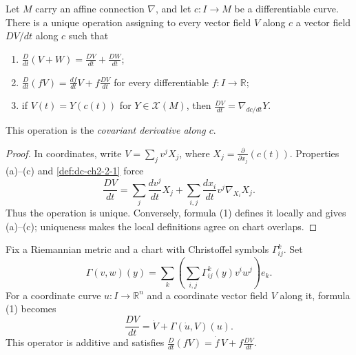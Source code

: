 \begin{proposition}
  \label{prop:dc-ch2-2-2}


  Let $M$ carry an affine connection $\nabla$, and let $c\colon I\to M$ be a
  differentiable curve. There is a unique operation assigning to every vector
  field $V$ along $c$ a vector field $DV/dt$ along $c$ such that
  \begin{enumerate}
    \item[(a)] $\frac{D}{dt}(V+W)=\frac{DV}{dt}+\frac{DW}{dt}$;
    \item[(b)] $\frac{D}{dt}(fV)=\frac{df}{dt}V+f\frac{DV}{dt}$ for every
      differentiable $f\colon I\to\mathbb{R}$;
    \item[(c)] if $V(t)=Y(c(t))$ for $Y\in\mathcal{X}(M)$, then
      $\frac{DV}{dt}=\nabla_{dc/dt}Y$.
  \end{enumerate}
  This operation is the \emph{covariant derivative along $c$}.
\end{proposition}
\begin{proof}

  \sketch
  In coordinates, write $V=\sum_jv^jX_j$, where
  $X_j=\frac{\partial}{\partial x_j}(c(t))$. Properties (a)--(c) and
  \cref{def:dc-ch2-2-1} force
  \[
    \frac{DV}{dt}
    =\sum_j\frac{dv^j}{dt}X_j
      +\sum_{i,j}\frac{dx_i}{dt}v^j\nabla_{X_i}X_j.\tag{1}
  \]
  Thus the operation is unique. Conversely, formula (1) defines it locally and
  gives (a)--(c); uniqueness makes the local definitions agree on chart
  overlaps.
\end{proof}

\begin{lemma}
  \label{lem:dc-ch2-2-2-coord}


  Fix a Riemannian metric and a chart with Christoffel symbols $\Gamma^k_{ij}$.
  Set
  \[
    \Gamma(v,w)(y)=\sum_k\left(\sum_{i,j}\Gamma^k_{ij}(y)v^iw^j\right)e_k.
  \]
  For a coordinate curve $u\colon I\to\mathbb{R}^n$ and a coordinate vector
  field $V$ along it, formula (1) becomes
  \[
    \frac{DV}{dt}=\dot V+\Gamma(\dot u,V)(u).
  \]
  This operator is additive and satisfies
  $\frac{D}{dt}(fV)=\dot f\,V+f\frac{DV}{dt}$.
\end{lemma}

